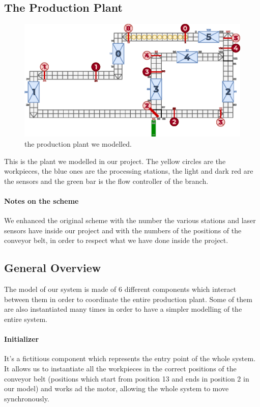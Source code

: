 \documentclass[a4paper]{article}
\begin{document}
    \subsection{The Production Plant}

    \begin{figure}[h!]
        \includegraphics[width=\columnwidth]{./images/plant}
        \caption{the production plant we modelled.}
        \label{figure:scheme}
    \end{figure}

    This is the plant we modelled in our project. The yellow circles are the workpieces, the blue ones are the processing stations, the light and dark red are the sensors and the green bar is the flow controller of the branch.

    \paragraph{Notes on the scheme} We enhanced the original scheme with the number the various stations and laser sensors have inside our project and with the numbers of the positions of the conveyor belt, in order to respect what we have done inside the project.

    \subsection{General Overview}

    The model of our system is made of 6 different components which interact between them in order to coordinate the entire production plant. Some of them are also instantiated many times in order to have a simpler modelling of the entire system.

    \paragraph{Initializer} It's a fictitious component which represents the entry point of the whole system. It allows us to instantiate all the workpieces in the correct positions of the conveyor belt (positions which start from position 13 and ends in position 2 in our model) and works ad the motor, allowing the whole system to move synchronously.
\end{document}
